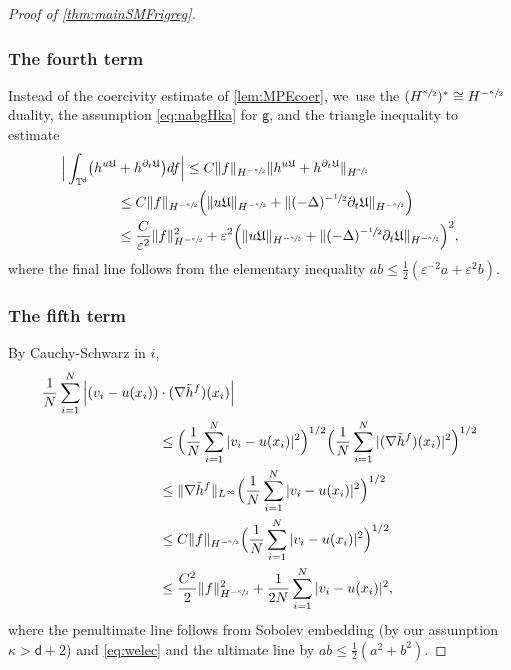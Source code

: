 \documentclass[JEP,XML,SOM,Unicode,published]{cedram}
\theoremstyle{plain}
\theoremstyle{definition}
\let\div\relax
\DeclareMathOperator{\div}{\mathrm{div}}
\newcommand{\T}{{\mathbb{T}}}
\let\vep\varepsilon
\let\ka\kappa
\let\nab\nabla
\let\p\partial
\let\tl\tilde
\newcommand{\Uu}{\mathfrak{U}}
\renewcommand{\d}{\mathsf{d}}
\newcommand{\g}{{\mathsf{g}}}
\begin{document}
\begin{proof}[Proof of \cref{thm:mainSMFrigreg}]
\subsubsection*{The fourth term} Instead of the coercivity estimate of \cref{lem:MPEcoer}, we~use the $(H^{\sfrac{\ka}{2}})^* \cong H^ {-\sfrac{\ka}{2}}$ duality, the assumption \eqref{eq:nabgHka} for $\g$, and the triangle inequality to estimate
\begin{equation}\label{eq:Gronreg1'}
\begin{aligned}
\Big|\int_{\T^\d}\bigl(\div h^{u\Uu}&+h^{\p_t\Uu}\bigr)df\Big| \le C\|f\|_{H^ {-\sfrac{\ka}{2}}} \|\div h^{u\Uu}+h^{\p_t\Uu}\|_{H^{\sfrac{\ka}{2}}}\\
&\le C\|f\|_{H^ {-\sfrac{\ka}{2}}} \Big( \|u\Uu\|_{H^ {-\sfrac{\ka}{2}}} + \|(-\Delta)^{-\sfrac{1}{2}}\p_t \Uu\|_{H^ {-\sfrac{\ka}{2}}}\Big)\\
&\le \frac{C}{\vep^2}\|f\|_{H^ {-\sfrac{\ka}{2}}}^2 + \vep^2 \Big( \|u\Uu\|_{H^ {-\sfrac{\ka}{2}}} + \|(-\Delta)^{-\sfrac{1}{2}}\p_t \Uu\|_{H^ {-\sfrac{\ka}{2}}}\Big)^2,
\end{aligned}
\end{equation}
where the final line follows from the elementary inequality $ab\le \frac12(\vep^{-2}a + \vep^2b)$.

\subsubsection*{The fifth term} By Cauchy-Schwarz in $i$,
\begin{equation}\label{eq:Gronreg2}
\begin{aligned}
\frac1N\sum_{i=1}^N \Big|(v_i-u(x_i))&\cdot(\nab\tl{h}^f)(x_i)\Big|\\
&\le \Big(\frac1N\sum_{i=1}^N |v_i-u(x_i)|^2\Big)^{1/2} \Big(\frac1N\sum_{i=1}^N |(\nab\tl{h}^f)(x_i)|^2\Big)^{1/2}\\
&\le \|\nab\tl{h}^{f}\|_{L^\infty} \Big(\frac1N\sum_{i=1}^N |v_i-u(x_i)|^2\Big)^{1/2}\\
&\le C\|f\|_{H^ {-\sfrac{\ka}{2}}}\Big(\frac1N\sum_{i=1}^N |v_i-u(x_i)|^2\Big)^{1/2}\\
&\le \frac{C^2}{2}\|f\|_{H^ {-\sfrac{\ka}{2}}}^2 + \frac{1}{2N}\sum_{i=1}^N |v_i-u(x_i)|^2,
\end{aligned}
\end{equation}
where the penultimate line follows from Sobolev embedding (by our assumption {$\ka>\d+2$}) and \eqref{eq:welec} and the ultimate line by $ab\le \frac12(a^2+b^2)$.


\end{proof}
\end{document}
